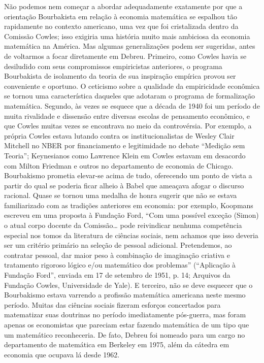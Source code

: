 \documentclass[a4paper,12pt]{article}[abntex2]
\begin{document}
Não podemos nem começar a abordar adequadamente exatamente por que a orientação Bourbakista em relação à economia matemática se espalhou tão rapidamente no contexto americano, uma vez que foi cristalizada dentro da Comissão Cowles; isso exigiria uma história muito mais ambiciosa da economia matemática na América. Mas algumas generalizações podem ser sugeridas, antes de voltarmos a focar diretamente em Debreu. Primeiro, como Cowles havia se desiludido com seus compromissos empiricistas anteriores, o programa Bourbakista de isolamento da teoria de sua inspiração empírica provou ser conveniente e oportuno. O ceticismo sobre a qualidade da empiricidade econômica se tornou uma característica daqueles que adotaram o programa de formalização matemática. Segundo, às vezes se esquece que a década de 1940 foi um período de muita rivalidade e dissensão entre diversas escolas de pensamento econômico, e que Cowles muitas vezes se encontrava no meio da controvérsia. Por exemplo, a própria Cowles estava lutando contra os institucionalistas de Wesley Clair Mitchell no NBER por financiamento e legitimidade no debate “Medição sem Teoria”; Keynesianos como Lawrence Klein em Cowles estavam em desacordo com Milton Friedman e outros no departamento de economia de Chicago. Bourbakismo prometia elevar-se acima de tudo, oferecendo um ponto de vista a partir do qual se poderia ficar alheio à Babel que ameaçava afogar o discurso racional. Quase se tornou uma medalha de honra sugerir que não se estava familiarizado com as tradições anteriores em economia: por exemplo, Koopmans escreveu em uma proposta à Fundação Ford, “Com uma possível exceção (Simon) o atual corpo docente da Comissão… pode reivindicar nenhuma competência especial nos tomos da literatura de ciências sociais, nem achamos que isso deveria ser um critério primário na seleção de pessoal adicional. Pretendemos, ao contratar pessoal, dar maior peso à combinação de imaginação criativa e tratamento rigoroso lógico e/ou matemático dos problemas” (“Aplicação à Fundação Ford”, enviada em 17 de setembro de 1951, p. 14; Arquivos da Fundação Cowles, Universidade de Yale). E terceiro, não se deve esquecer que o Bourbakismo estava varrendo a profissão matemática americana neste mesmo período. Muitas das ciências sociais fizeram esforços concertados para matematizar suas doutrinas no período imediatamente pós-guerra, mas foram apenas os economistas que pareciam estar fazendo matemática de um tipo que um matemático reconheceria. De fato, Debreu foi nomeado para um cargo no departamento de matemática em Berkeley em 1975, além da cátedra em economia que ocupava lá desde 1962.
\end{document}
